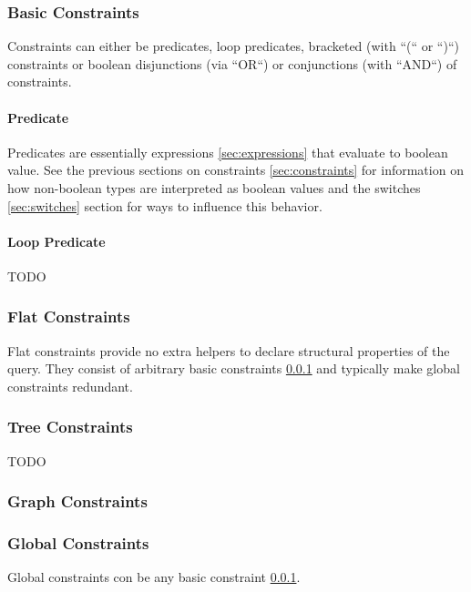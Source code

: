 \documentclass[11pt]{article}
\begin{document}
\subsubsection{Basic Constraints}
\label{sec:basic-constraints}

Constraints can either be predicates, loop predicates, bracketed (with ``(`` or ``)``) constraints or boolean disjunctions (via ``OR``) or conjunctions (with ``AND``) of constraints.

\paragraph{Predicate}
\label{sec:predicate}

Predicates are essentially expressions \cref{sec:expressions} that evaluate to boolean value. See the previous sections on constraints \cref{sec:constraints} for information on how non-boolean types are interpreted as boolean values and the switches \cref{sec:switches} section for ways to influence this behavior.

\paragraph{Loop Predicate}

TODO

\subsubsection{Flat Constraints}
\label{sec:flat-constraints}

Flat constraints provide no extra helpers to declare structural properties of the query. They consist of arbitrary basic constraints \cref{sec:basic-constraints} and typically make global constraints redundant.

\subsubsection{Tree Constraints}
\label{sec:tree-constraints}

TODO

\subsubsection{Graph Constraints}
\label{sec:graph-constraints}


\subsubsection{Global Constraints}
\label{sec:global-constraints}

Global constraints con be any basic constraint \cref{sec:basic-constraints}.
\end{document}
